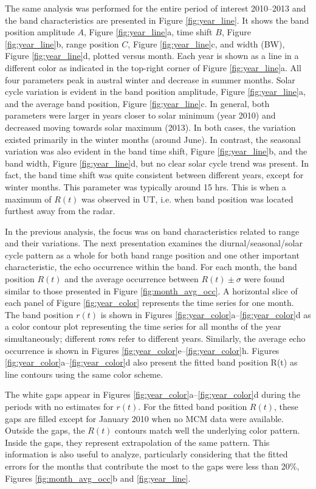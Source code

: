The same analysis was performed for the entire period of interest 2010--2013 and the band characteristics are presented in Figure \ref{fig:year_line}. It shows the band position amplitude \(A\), Figure \ref{fig:year_line}a, time shift \(B\), Figure \ref{fig:year_line}b, range position \(C\), Figure \ref{fig:year_line}c, and width (BW), Figure \ref{fig:year_line}d, plotted versus month.  Each year is shown as a line in a different color as indicated in the top-right corner of Figure \ref{fig:year_line}a.  All four parameters peak in austral winter and decrease in summer months. Solar cycle variation is evident in the band position amplitude, Figure \ref{fig:year_line}a, and the average band position, Figure \ref{fig:year_line}c. In general, both parameters were larger in years closer to solar minimum (year 2010) and decreased moving towards solar maximum (2013).  In both cases, the variation existed primarily in the winter months (around June). In contrast, the seasonal variation was also evident in the band time shift, Figure \ref{fig:year_line}b, and the band width, Figure \ref{fig:year_line}d, but no clear solar cycle trend was present. In fact, the band time shift was quite consistent between different years, except for winter months. This parameter was typically around 15 hrs. This is when a maximum of \(R\left(t\right)\) was observed in UT, i.e. when band position was located furthest away from the radar.

In the previous analysis, the focus was on band characteristics related to range and their variations. The next presentation examines the diurnal/seasonal/solar cycle pattern as a whole for both band range position and one other important characteristic, the echo occurrence within the band. For each month, the band position \(R\left(t\right)\) and the average occurrence between \(R\left(t\right)\pm \sigma\) were found similar to those presented in Figure \ref{fig:month_avg_occ}. A horizontal slice of each panel of Figure \ref{fig:year_color} represents the time series for one month. The band position \(r\left(t\right)\) is shown in Figures \ref{fig:year_color}a--\ref{fig:year_color}d as a color contour plot representing the time series for all months of the year simultaneously; different rows refer to  different years. Similarly, the average echo occurrence is shown in Figures \ref{fig:year_color}e--\ref{fig:year_color}h.  Figures \ref{fig:year_color}a--\ref{fig:year_color}d also present the fitted band position R(t) as line contours using the same color scheme.

The white gaps appear in Figures \ref{fig:year_color}a--\ref{fig:year_color}d during the periods with no estimates for \(r(t)\).  For the fitted band position \(R(t)\), these gaps are filled except for January 2010 when no MCM data were available.  Outside the gaps, the \(R(t)\) contours match well the underlying color pattern.  Inside the gaps, they represent extrapolation of the same pattern. This information is also useful to analyze, particularly considering that the fitted errors for the months that contribute the most to the gaps were less than 20\%, Figures \ref{fig:month_avg_occ}b and \ref{fig:year_line}.
	
